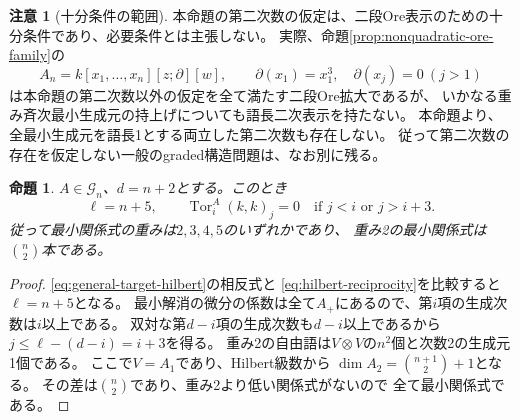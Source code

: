 \documentclass[11pt,a4paper]{ltjsarticle}
\newtheorem{proposition}[theorem]{命題}
\theoremstyle{definition}
\newcommand{\Tor}{\operatorname{Tor}}
\newcommand{\Gclass}{\mathcal G}
\newtheorem{remark}[theorem]{注意}
\begin{document}
\begin{remark}[十分条件の範囲]
本命題の第二次数の仮定は、二段Ore表示のための十分条件であり、必要条件とは主張しない。
実際、命題\ref{prop:nonquadratic-ore-family}の
\[
 A_n=k[x_1,\ldots,x_n][z;\partial][w],\qquad
 \partial(x_1)=x_1^3,\quad\partial(x_j)=0\ (j>1)
\]
は本命題の第二次数以外の仮定を全て満たす二段Ore拡大であるが、
いかなる重み斉次最小生成元の持上げについても語長二次表示を持たない。
本命題より、全最小生成元を語長1とする両立した第二次数も存在しない。
従って第二次数の存在を仮定しない一般のgraded構造問題は、なお別に残る。
\end{remark}

\begin{proposition}\label{prop:four-strands}
$A\in\Gclass_n$、$d=n+2$とする。このとき
\[
\ell=n+5,\qquad
\Tor_i^A(k,k)_j=0\quad\text{if }j<i\text{ or }j>i+3.
\]
従って最小関係式の重みは$2,3,4,5$のいずれかであり、
重み2の最小関係式は$\binom n2$本である。
\end{proposition}

\begin{proof}
\eqref{eq:general-target-hilbert}の相反式と
\eqref{eq:hilbert-reciprocity}を比較すると$\ell=n+5$となる。
最小解消の微分の係数は全て$A_+$にあるので、第$i$項の生成次数は$i$以上である。
双対な第$d-i$項の生成次数も$d-i$以上であるから
$j\leq\ell-(d-i)=i+3$を得る。
重み2の自由語は$V\otimes V$の$n^2$個と次数2の生成元1個である。
ここで$V=A_1$であり、Hilbert級数から
$\dim A_2=\binom{n+1}{2}+1$となる。
その差は$\binom n2$であり、重み2より低い関係式がないので
全て最小関係式である。
\end{proof}
\end{document}
